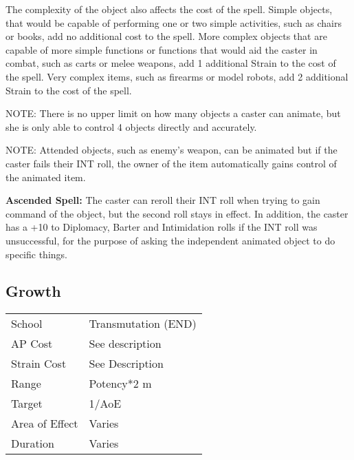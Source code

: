 \documentclass[11pt,a4paper,twocolumn]{book}
\begin{document}
\medskip

The complexity of the object also affects the cost of the spell. Simple objects, that would be capable of performing one or two simple activities, such as chairs or books, add no additional cost to the spell. More complex objects that are capable of more simple functions or functions that would aid the caster in combat, such as carts or melee weapons, add 1 additional Strain to the cost of the spell. Very complex items, such as firearms or model robots, add 2 additional Strain to the cost of the spell.

NOTE: There is no upper limit on how many objects a caster can animate, but she is only able to control 4 objects directly and accurately.

NOTE: Attended objects, such as enemy's weapon, can be animated but if the caster fails their INT roll, the owner of the item automatically gains control of the animated item.


\bigskip

\textbf{Ascended Spell:} The caster can reroll their INT roll when trying to gain command of the object, but the second roll stays in effect. In addition, the caster has a +10 to Diplomacy, Barter and Intimidation rolls if the INT roll was unsuccessful, for the purpose of asking the independent animated object to do specific things.

\vfill

\subsection*{Growth}
{
	\begin{tabu} to 75mm{| X[l,4] | X[l,7] |}
		\hline
		School 			& Transmutation (END) 	\\
		AP Cost	      	& See description 		\\
		Strain Cost     & See Description 		\\
		Range     		& Potency*2 m 			\\
		Target      	& 1/AoE					\\
		Area of Effect  & Varies  	 			\\
		Duration     	& Varies 				\\ \hline
	\end{tabu}
	
}
\end{document}
